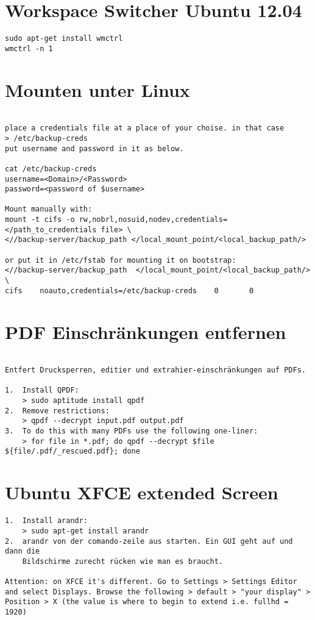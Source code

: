 \documentclass[a4paper,10pt]{report}
\begin{document}
\section{Workspace Switcher Ubuntu 12.04 }
\begin{verbatim}
sudo apt-get install wmctrl
wmctrl -n 1
\end{verbatim}


\section{Mounten unter Linux}
\begin{verbatim}

place a credentials file at a place of your choise. in that case 
> /etc/backup-creds
put username and password in it as below.

cat /etc/backup-creds
username=<Domain>/<Password>
password=<password of $username>

Mount manually with:
mount -t cifs -o rw,nobrl,nosuid,nodev,credentials=</path_to_credentials file> \
<//backup-server/backup_path </local_mount_point/<local_backup_path/>

or put it in /etc/fstab for mounting it on bootstrap:
<//backup-server/backup_path  </local_mount_point/<local_backup_path/>  \
cifs    noauto,credentials=/etc/backup-creds    0       0
\end{verbatim}

\section{PDF Einschränkungen entfernen}
\begin{verbatim}

Entfert Drucksperren, editier und extrahier-einschränkungen auf PDFs.

1.  Install QPDF:
    > sudo aptitude install qpdf
2.  Remove restrictions:
    > qpdf --decrypt input.pdf output.pdf
3.  To do this with many PDFs use the following one-liner:
    > for file in *.pdf; do qpdf --decrypt $file ${file/.pdf/_rescued.pdf}; done

\end{verbatim}

\section{Ubuntu XFCE extended Screen}
\begin{verbatim}
1.  Install arandr:
    > sudo apt-get install arandr
2.  arandr von der comando-zeile aus starten. Ein GUI geht auf und dann die 
    Bildschirme zurecht rücken wie man es braucht.

Attention: on XFCE it's different. Go to Settings > Settings Editor
and select Displays. Browse the following > default > "your display" > 
Position > X (the value is where to begin to extend i.e. fullhd = 1920)
\end{verbatim}
\pagebreak
\end{document}
